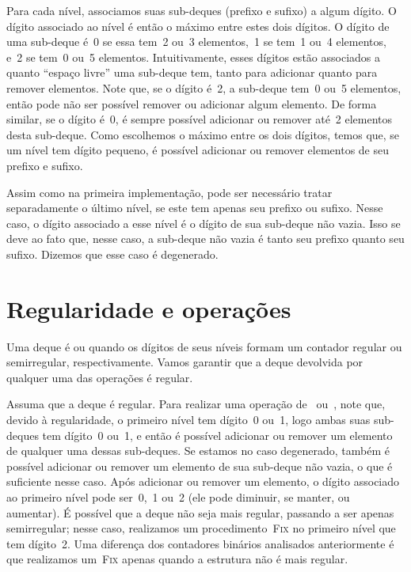 \documentclass[main.tex]{subfiles}
\begin{document}
Para cada nível, associamos suas sub-deques (prefixo e sufixo) a algum dígito. O dígito associado ao nível é então o máximo entre estes dois dígitos. O dígito de uma sub-deque é~0 se essa tem~2 ou~3 elementos,~1 se tem~1 ou~4 elementos, e~2 se tem~0 ou~5 elementos. Intuitivamente, esses dígitos estão associados a quanto ``espaço livre'' uma sub-deque tem, tanto para adicionar quanto para remover elementos. Note que, se o dígito é~2, a sub-deque tem~0 ou~5 elementos, então pode não ser possível remover ou adicionar algum elemento. De forma similar, se o dígito é~0, é sempre possível adicionar ou remover até~2 elementos desta sub-deque. Como escolhemos o máximo entre os dois dígitos, temos que, se um nível tem dígito pequeno, é possível adicionar ou remover elementos de seu prefixo e sufixo.

Assim como na primeira implementação, pode ser necessário tratar separadamente o último nível, se este tem apenas seu prefixo ou sufixo. Nesse caso, o dígito associado a esse nível é o dígito de sua sub-deque não vazia. Isso se deve ao fato que, nesse caso, a sub-deque não vazia é tanto seu prefixo quanto seu sufixo. Dizemos que esse caso é degenerado.

\section{Regularidade e operações} \label{sec:reg_op}

Uma deque é  ou  quando os dígitos de seus níveis formam um contador regular ou semirregular, respectivamente. Vamos garantir que a deque devolvida por qualquer uma das operações é regular.

Assuma que a deque é regular. Para realizar uma operação de~ ou~, note que, devido à regularidade, o primeiro nível tem dígito~0 ou~1, logo ambas suas sub-deques tem dígito~0 ou~1, e então é possível adicionar ou remover um elemento de qualquer uma dessas sub-deques. Se estamos no caso degenerado, também é possível adicionar ou remover um elemento de sua sub-deque não vazia, o que é suficiente nesse caso.
Após adicionar ou remover um elemento, o dígito associado ao primeiro nível pode ser~0,~1 ou~2 (ele pode diminuir, se manter, ou aumentar). É possível que a deque não seja mais regular, passando a ser apenas semirregular; nesse caso, realizamos um procedimento~\textsc{Fix} no primeiro nível que tem dígito~2. Uma diferença dos contadores binários analisados anteriormente é que realizamos um~\textsc{Fix} apenas quando a estrutura não é mais regular.
\end{document}
